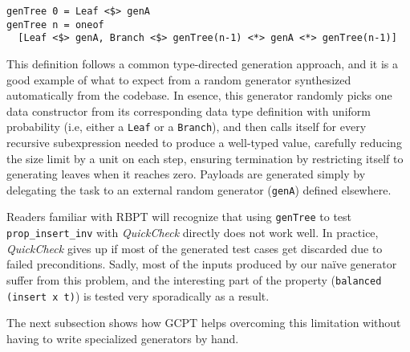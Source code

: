 \documentclass[sigconf, anonymous, review]{acmart}
\newcommand{\quickcheck}{\textit{QuickCheck}\xspace}
\begin{document}


\begin{verbatim}
genTree 0 = Leaf <$> genA
genTree n = oneof
  [Leaf <$> genA, Branch <$> genTree(n-1) <*> genA <*> genTree(n-1)]
\end{verbatim}

\noindent This definition follows a common type-directed generation approach,
and it is a good example of what to expect from a random generator synthesized
automatically from the codebase.
%
In esence, this generator randomly picks one data constructor from its
corresponding data type definition with uniform probability (i.e, either a
\texttt{Leaf} or a \texttt{Branch}), and then calls itself for every recursive
subexpression needed to produce a well-typed value, carefully reducing the size
limit by a unit on each step, ensuring termination by restricting itself to
generating leaves when it reaches zero.
%
Payloads are generated simply by delegating the task to an external random
generator (\texttt{genA}) defined elsewhere.
%


Readers familiar with RBPT will recognize that using \texttt{genTree} to test
\texttt{prop\_insert\_inv} with \quickcheck directly does not work well.
%
In practice, \quickcheck gives up if most of the generated test cases get
discarded due to failed preconditions.
%
%
Sadly, most of the inputs produced by our na\"ive generator suffer from this
problem, and the interesting part of the property (\texttt{balanced (insert x
  t)}) is tested very sporadically as a result.

The next subsection shows how GCPT helps overcoming this limitation without
having to write specialized generators by hand.
\end{document}
